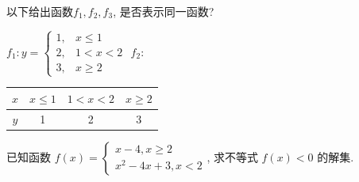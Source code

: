 \documentclass{article}
\begin{document}
\begin{Exercise}
        \Question 以下给出函数$f_1, f_2, f_3$, 是否表示同一函数? 

        $ f_1: y = \left\{ \begin{array}{ll}
            1, & x \leqslant 1 \\
            2, & 1 < x <2 \\
            3, & x \geqslant 2 
        \end{array} \right. $
        \hspace{1cm}
        $f_2: $
        \begin{tabular}{|c||c|c|c|}
            \hline
            $x$ & $x \leqslant 1$ &$ 1 < x <2$ & $x \geqslant 2$ \\
            \hline
            $y$ & 1 & 2 & 3 \\
            \hline
        \end{tabular}

        \Question 已知函数 $f(x) = \left\{ \begin{array}{l}
            x-4, x \geqslant 2 \\
            x^2 - 4x + 3, x < 2
        \end{array}\right.$, 求不等式 $f(x) < 0$ 的解集.

    \end{Exercise}
    
\end{document}
